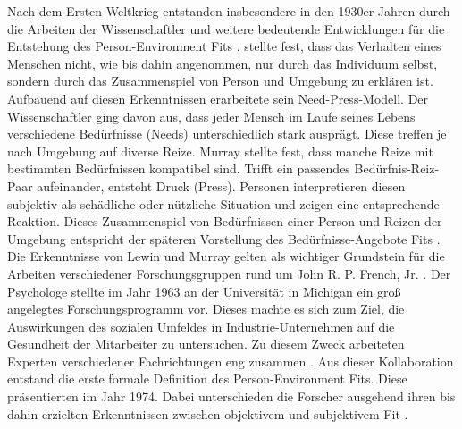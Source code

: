 Nach dem Ersten Weltkrieg entstanden insbesondere in den 1930er-Jahren durch die Arbeiten der Wissenschaftler \textcite{lewin:1936} und \textcite{murray:1938} weitere bedeutende Entwicklungen für die Entstehung des Person-Environment Fits \cite[S. 1]{edwards:1990}. \textcite[S. 11f.]{lewin:1936} stellte fest, dass das Verhalten eines Menschen nicht, wie bis dahin angenommen, nur durch das Individuum selbst, sondern durch das Zusammenspiel von Person und Umgebung zu erklären ist. Aufbauend auf diesen Erkenntnissen erarbeitete \textcite[S. 38ff.]{murray:1938} sein Need-Press-Modell. Der Wissenschaftler ging davon aus, dass jeder Mensch im Laufe seines Lebens verschiedene Bedürfnisse (Needs) unterschiedlich stark ausprägt. Diese treffen je nach Umgebung auf diverse Reize. Murray stellte fest, dass manche Reize mit bestimmten Bedürfnissen kompatibel sind. Trifft ein passendes Bedürfnis-Reiz-Paar aufeinander, entsteht Druck (Press). Personen interpretieren diesen subjektiv als schädliche oder nützliche Situation und zeigen eine entsprechende Reaktion. Dieses Zusammenspiel von Bedürfnissen einer Person und Reizen der Umgebung entspricht der späteren Vorstellung des Bedürfnisse-Angebote Fits \cite[S. 8]{edwards:2008}. \\
Die Erkenntnisse von Lewin und Murray gelten als wichtiger Grundstein für die Arbeiten verschiedener Forschungsgruppen rund um John R. P. French, Jr. \cite[S. 5]{caplan:1993}. Der Psychologe stellte im Jahr 1963 an der Universität in Michigan ein groß angelegtes Forschungsprogramm vor. Dieses machte es sich zum Ziel, die Auswirkungen des sozialen Umfeldes in Industrie-Unternehmen auf die Gesundheit der Mitarbeiter zu untersuchen. Zu diesem Zweck arbeiteten Experten verschiedener Fachrichtungen eng zusammen \cite[S. 1ff.]{french:1963}. Aus dieser Kollaboration entstand die erste formale Definition des Person-Environment Fits. Diese präsentierten \textcite{copingAndAdaption:1974} im Jahr 1974. Dabei unterschieden die Forscher ausgehend ihren bis dahin erzielten Erkenntnissen zwischen objektivem und subjektivem Fit \cite[S. 4f.]{caplan:1993}\cite[S. 1ff.]{french:1966}.


